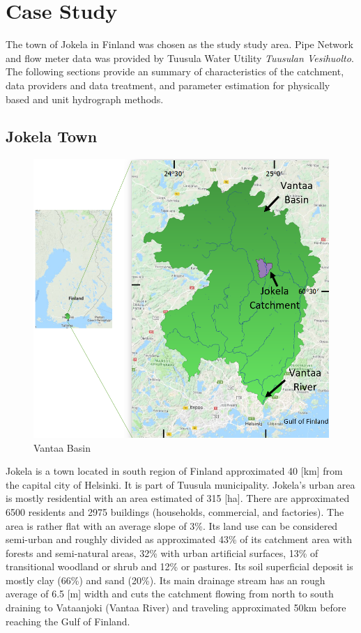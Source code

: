 
\chapter{Case Study}

The town of Jokela in Finland was chosen as the study study area. Pipe Network and flow meter data was provided by Tuusula Water Utility \textit{Tuusulan Vesihuolto}. The following sections provide an summary of characteristics of the catchment, data providers and data treatment, and parameter estimation for physically based and unit hydrograph methods.

\section{Jokela Town} \label{jokelatown}

\begin{figure}[ht]
    \centering
	\includegraphics[scale=0.75]{figures/vantaa_basin.png}
	\caption{Vantaa Basin}
	\label{fig:rdiixdwf}
\end{figure}

Jokela is a town located in south region of Finland approximated 40 [km] from the capital city of Helsinki. It is part of Tuusula municipality. Jokela's urban area is mostly residential with an area estimated of 315 [ha]. There are approximated 6500 residents and 2975 buildings (households, commercial, and factories). The area is rather flat with an average slope of 3\%. Its land use can be considered semi-urban and roughly divided as approximated 43\% of its catchment area with forests and semi-natural areas, 32\% with urban artificial surfaces, 13\% of transitional woodland or shrub and 12\% or pastures. Its soil superficial deposit is mostly clay (66\%) and sand (20\%). Its main drainage stream has an rough average of 6.5 [m] width and cuts the catchment flowing from north to south draining to Vataanjoki (Vantaa River) and traveling approximated 50km before reaching the Gulf of Finland. 


